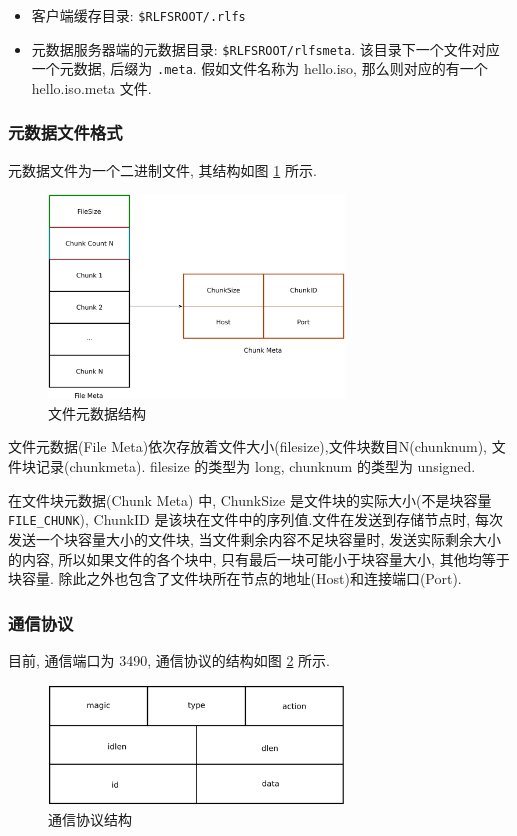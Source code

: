 \begin{itemize}
    \item 客户端缓存目录: \verb|$RLFSROOT/.rlfs|
    \item 元数据服务器端的元数据目录: \verb|$RLFSROOT/rlfsmeta|.
        该目录下一个文件对应一个元数据, 后缀为 \verb|.meta|.
        假如文件名称为 hello.iso, 那么则对应的有一个 hello.iso.meta 文件.
\end{itemize}


\subsubsection{元数据文件格式}
元数据文件为一个二进制文件, 其结构如图 \ref{fig:filemeta} 所示.

\begin{figure}[H]
    \centerline{\includegraphics[width=0.7\textwidth]{./Figures/filemeta.pdf}}
    \caption{文件元数据结构}
    \label{fig:filemeta}
\end{figure}

文件元数据(File Meta)依次存放着文件大小(filesize),文件块数目N(chunknum), 文件块记录(chunkmeta).
filesize 的类型为 long, chunknum 的类型为 unsigned.

在文件块元数据(Chunk Meta) 中, ChunkSize 是文件块的实际大小(不是块容量 \verb|FILE_CHUNK|),
ChunkID 是该块在文件中的序列值.文件在发送到存储节点时, 每次发送一个块容量大小的文件块,
当文件剩余内容不足块容量时, 发送实际剩余大小的内容,
所以如果文件的各个块中, 只有最后一块可能小于块容量大小, 其他均等于块容量.
除此之外也包含了文件块所在节点的地址(Host)和连接端口(Port).

\subsubsection{通信协议}
目前, 通信端口为 3490, 通信协议的结构如图 \ref{fig:rlfsmsg} 所示.

\begin{figure}[H]
    \centerline{\includegraphics[width=0.7\textwidth]{./Figures/rlfsmsg.pdf}}
    \caption{通信协议结构}
    \label{fig:rlfsmsg}
\end{figure}

